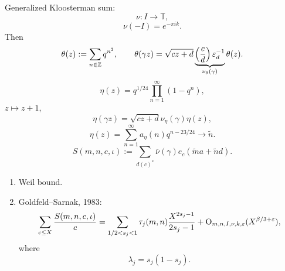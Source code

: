\documentclass[reqno]{amsart} 
\begin{document}
Generalized Kloosterman sum:
\begin{equation*}
\nu : I \rightarrow \mathbb{T},
\end{equation*}
\begin{equation*}
\nu(-I) = e^{- \pi i k}.
\end{equation*}
Then
\begin{equation*}
  \theta (z) := \sum_{n \in \mathbb{Z} } q^{n^2 },
  \qquad
  \theta (\gamma z) = \sqrt{c z + d }
  \underbrace
{
  \left( \frac{c}{d} \right)  \varepsilon_d^{-1}
}_{
\nu_\theta (\gamma)
}
  \theta (z) .
\end{equation*}
\begin{equation*}
  \eta (z) = q^{1/24} \prod_{n = 1 }^\infty (1  - q^n ),
\end{equation*}
$z \mapsto z + 1$,
\begin{equation*}
\eta (\gamma z ) = \sqrt{c z + d} \nu_\eta (\gamma) \eta (z),
\end{equation*}
\begin{equation*}
\eta (z) = \sum_{n = 1 }^\infty a_\eta (n) q^{n - 23/24} \rightarrow \tilde{n}.
\end{equation*}
\begin{equation*}
S (m, n, c, \iota ) := \sum_{d (c)^*} \overline{\nu } (\gamma) e_c (\tilde{m} a + \tilde{n} d).
\end{equation*}
\begin{enumerate}
\item Weil bound.
\item Goldfeld--Sarnak, 1983:
  \begin{equation*}
    \sum_{c \leq X } \frac{S (m, n, c, \iota )}{c}
    =
    \sum_{1/2 < s_j < 1}
    \tau_j (m, n)
    \frac{X^{2 s_j - 1 }}{ 2 s_j - 1 }
    + \operatorname{O}_{m, n, I, \nu, k, \varepsilon } (X^{\beta / 3 + \varepsilon }),
  \end{equation*}
  where
  \begin{equation*}
    \lambda_j = s_j (1 - s_j ).
\end{equation*}
\end{enumerate}



{} 
\end{document}
